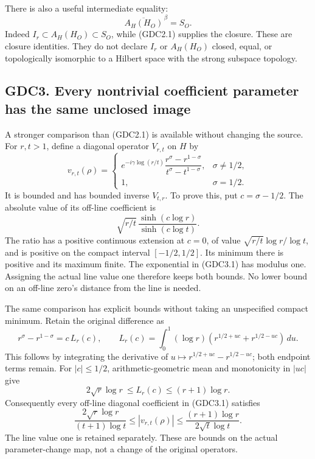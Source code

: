 There is also a useful intermediate equality: \[
\overline{A_H(H_O)}^{\,\beta}=S_O.
\tag{GDC2.2}
\] Indeed \(I_r\subset A_H(H_O)\subset S_O\), while (GDC2.1) supplies
the closure. These are closure identities. They do not declare \(I_r\)
or \(A_H(H_O)\) closed, equal, or topologically isomorphic to a Hilbert
space with the strong subspace topology.

\subsection{GDC3. Every nontrivial coefficient parameter has the same
unclosed
image}\label{gdc3.-every-nontrivial-coefficient-parameter-has-the-same-unclosed-image}

A stronger comparison than (GDC2.1) is available without changing the
source. For \(r,t>1\), define a diagonal operator \(V_{r,t}\) on \(H\)
by \[
v_{r,t}(\rho)=
\begin{cases}
e^{-i\gamma\log(r/t)}\dfrac{r^\sigma-r^{1-\sigma}}{t^\sigma-t^{1-\sigma}},&\sigma\ne1/2,\\
1,&\sigma=1/2.
\end{cases}
\tag{GDC3.1}
\] It is bounded and has bounded inverse \(V_{t,r}\). To prove this, put
\(c=\sigma-1/2\). The absolute value of its off-line coefficient is \[
\sqrt{r/t}\,\frac{\sinh(c\log r)}{\sinh(c\log t)}.
\tag{GDC3.2}
\] The ratio has a positive continuous extension at \(c=0\), of value
\(\sqrt{r/t}\log r/\log t\), and is positive on the compact interval
\([-1/2,1/2]\). Its minimum there is positive and its maximum finite.
The exponential in (GDC3.1) has modulus one. Assigning the actual line
value one therefore keeps both bounds. No lower bound on an off-line
zero's distance from the line is needed.

The same comparison has explicit bounds without taking an unspecified
compact minimum. Retain the original difference as \[
r^\sigma-r^{1-\sigma}=c\,L_r(c),\qquad
L_r(c)=\int_0^1(\log r)
\left(r^{1/2+uc}+r^{1/2-uc}\right)\,du.
\] This follows by integrating the derivative of
\(u\mapsto r^{1/2+uc}-r^{1/2-uc}\); both endpoint terms remain. For
\(|c|\le1/2\), arithmetic-geometric mean and monotonicity in \(|uc|\)
give \[
2\sqrt r\log r\ \le L_r(c)\le(r+1)\log r.
\] Consequently every off-line diagonal coefficient in (GDC3.1)
satisfies \[
\frac{2\sqrt r\log r}{(t+1)\log t}
\le |v_{r,t}(\rho)|
\le \frac{(r+1)\log r}{2\sqrt t\log t}.
\tag{GDC3.2a}
\] The line value one is retained separately. These are bounds on the
actual parameter-change map, not a change of the original operators.

